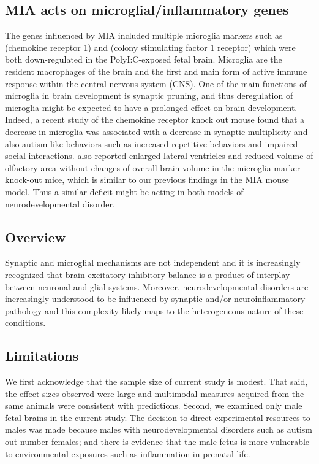 \subsection{MIA acts on microglial/inflammatory genes}
The genes influenced by MIA included multiple microglia markers such as  (chemokine receptor 1) and  (colony stimulating factor 1 receptor) which were both down-regulated in the PolyI:C-exposed fetal brain. 
Microglia are the resident macrophages of the brain and the first and main form of active immune response within the central nervous system (CNS).
One of the main functions of microglia in brain development is synaptic pruning\cite{Paolicelli2011}, and thus deregulation of microglia might be expected to have a prolonged effect on brain development. 
Indeed, a recent study of the chemokine receptor  knock out mouse found that a decrease in microglia was associated with a decrease in synaptic multiplicity and also autism-like behaviors such as increased repetitive behaviors and impaired social interactions\cite{Rogers2011}. 
\citet{Erblich2011} also reported enlarged lateral ventricles and reduced volume of olfactory area without changes of overall brain volume in the microglia marker  knock-out mice, which is similar to our previous findings in the MIA mouse model\cite{Li2009c}. 
Thus a similar  deficit might be acting in both models of neurodevelopmental disorder.
	
\subsection{Overview}
Synaptic and microglial mechanisms are not independent and it is increasingly recognized that brain excitatory-inhibitory balance is a product of interplay between neuronal and glial systems\cite{Zhan2014}. 
Moreover, neurodevelopmental disorders are increasingly understood to be influenced by synaptic and/or neuroinflammatory pathology and this complexity likely maps to the heterogeneous nature of these conditions\cite{Garay2010}.

\subsection{Limitations}
We first acknowledge that the sample size of current study is modest. 
That said, the effect sizes observed were large and multimodal measures acquired from the same animals were consistent with predictions. 
Second, we examined only male fetal brains in the current study. 
The decision to direct experimental resources to males was made because males with neurodevelopmental disorders such as autism out-number females; and there is evidence that the male fetus is more vulnerable to environmental exposures such as inflammation in prenatal life\cite{Bergeron2013}\cite{Lein2007}. 


